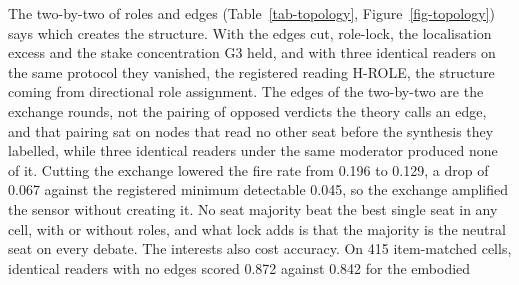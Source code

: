The two-by-two of roles and edges (Table~\ref{tab-topology}, Figure~\ref{fig-topology}) says which
creates the structure. With the edges cut, role-lock, the localisation
excess and the stake concentration G3 held, and with three identical
readers on the same protocol they vanished, the registered reading H-ROLE,
the structure coming from directional role assignment.
The edges of the two-by-two are the exchange rounds, not the pairing of
opposed verdicts the theory calls an edge, and that pairing sat on nodes
that read no other seat before the synthesis they labelled, while three
identical readers under the same moderator produced none of it.
Cutting the exchange lowered the fire rate from 0.196 to 0.129, a drop of
0.067 against the registered minimum detectable 0.045, so the exchange
amplified the sensor without creating it.
No seat majority beat the best single seat in any cell, with or without
roles, and what lock adds is that the majority is the neutral seat on every
debate.
The interests also cost accuracy. On 415 item-matched cells, identical
readers with no edges scored 0.872 against 0.842 for the embodied
